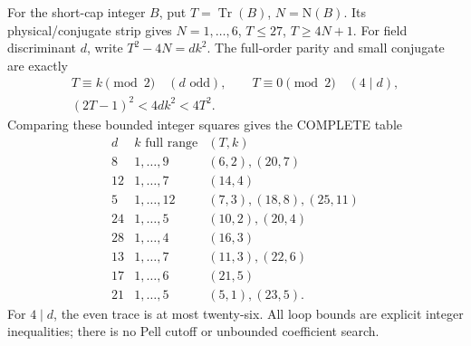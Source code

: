 \documentclass[11pt]{article}
\begin{document}
For the short-cap integer \(B\), put
\(T=\operatorname{Tr}(B)\), \(N=\mathrm N(B)\).
Its physical/conjugate strip gives
\(N=1,\ldots,6\), \(T\le27\), \(T\ge4N+1\).
For field discriminant \(d\), write
\(T^2-4N=dk^2\).
The full-order parity and small conjugate
are exactly
\[
 \begin{gathered}
 T\equiv k\pmod2\quad(d\text{ odd}),\qquad
 T\equiv0\pmod2\quad(4\mid d),\\
                         (2T-1)^2<4dk^2<4T^2 .
 \end{gathered}
\]
Comparing these bounded integer squares
gives the COMPLETE table
\[
\begin{array}{c|c|l}
 d&k\text{ full range}&(T,k)\\ \hline
 8&1,\ldots,9&(6,2),(20,7)\\
 12&1,\ldots,7&(14,4)\\
 5&1,\ldots,12&(7,3),(18,8),(25,11)\\
 24&1,\ldots,5&(10,2),(20,4)\\
 28&1,\ldots,4&(16,3)\\
 13&1,\ldots,7&(11,3),(22,6)\\
 17&1,\ldots,6&(21,5)\\
 21&1,\ldots,5&(5,1),(23,5).
\end{array}
\]
For \(4\mid d\), the even trace is at
most twenty-six.
All loop bounds are explicit integer
inequalities; there is no Pell cutoff
or unbounded coefficient search.
\end{document}
